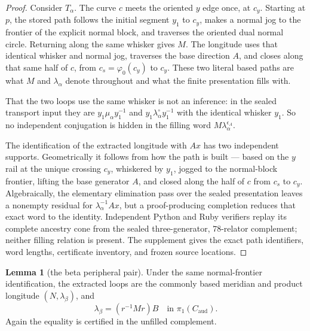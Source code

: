 \documentclass[11pt]{article}
\newcommand{\pione}{\pi_1}
\theoremstyle{definition}
\newtheorem{lemma}[theorem]{Lemma}
\begin{document}
\begin{proof}
Consider $T_\alpha$.  The curve $c$ meets the oriented $y$ edge once, at
$c_y$.  Starting at $p$, the stored path follows the initial segment $y_1$
to $c_y$, makes a normal jog to the frontier of the explicit normal block,
and traverses the oriented dual normal circle.  Returning along the same
whisker gives $M$.  The longitude uses that identical whisker and normal
jog, traverses the base direction $A$, and closes along that same half of
$c$, from $c_s=\varphi_0(c_y)$ to $c_y$.  These two literal based paths are
what $M$ and $\lambda_\alpha$ denote throughout and what the finite
presentation fills with.

That the two loops use the same whisker is not an inference: in the sealed
transport input they are
$y_1\mu_\alpha y_1^{-1}$ and
$y_1\lambda_\alpha^{\circ}y_1^{-1}$ with the identical whisker $y_1$.
So no independent conjugation is
hidden in the filling word
$M\lambda_\alpha^{\epsilon_A}$.

The identification of the extracted longitude with $Ax$ has two independent
supports.  Geometrically it follows from how
the path is built --- based on the $y$ rail at the unique crossing $c_y$,
whiskered by $y_1$, jogged to the normal-block frontier, lifting the base
generator $A$, and closed along the half of $c$ from $c_s$ to $c_y$.  Algebraically,
the elementary elimination pass over the sealed presentation leaves a
nonempty residual for $\lambda_\alpha^{-1}Ax$, but a proof-producing
completion reduces that exact word to the identity.  Independent Python and
Ruby verifiers replay its complete ancestry cone from the sealed
three-generator, $78$-relator complement; neither filling relation is
present.  The supplement gives the exact path identifiers, word lengths,
certificate inventory, and frozen source locations.
\end{proof}

\begin{lemma}[the beta peripheral pair]\label{lem:beta-peripheral}
Under the same normal-frontier identification, the extracted loops are the commonly based meridian and
product longitude $(N,\lambda_\beta)$, and
\[
 \lambda_\beta=(r^{-1}Mr)B\quad\text{in }\pione(C_{\mathrm{aud}}).
\]
Again the equality is certified in the unfilled complement.
\end{lemma}
\end{document}
